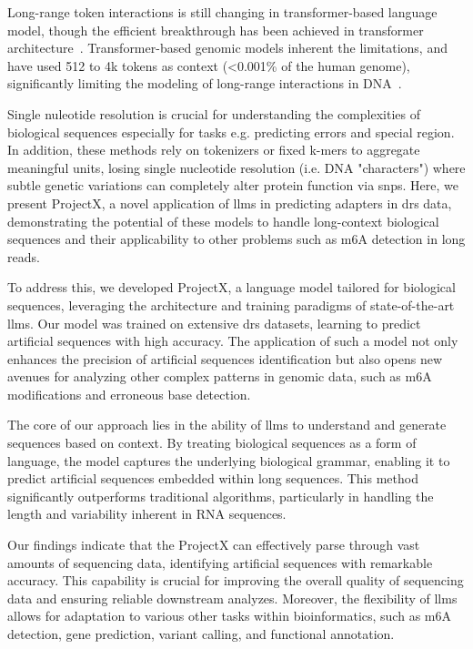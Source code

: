 \documentclass[pdflatex, sn-mathphys-num, lineno]{sn-jnl}%
\newcommand{\chopper}{ProjectX\xspace}
\theoremstyle{thmstyleone}%
\theoremstyle{thmstyletwo}%
\theoremstyle{thmstylethree}%
\begin{document}
Long-range token interactions is still changing in transformer-based language model,
though the efficient breakthrough has been achieved in transformer architecture~\cite{tay2022efficient}.
Transformer-based genomic models  inherent the limitations, and have used 512 to 4k tokens as context (<0.001\% of the human genome), significantly limiting the modeling of long-range interactions in DNA~\cite{dalla2023nucleotide, zhou2023dnabert2, ji2021dnabert}.

Single nuleotide resolution is crucial for understanding the complexities of biological sequences especially for tasks e.g. predicting errors and special region.
In addition, these methods rely on tokenizers or fixed k-mers to aggregate meaningful units, losing single nucleotide resolution (i.e. DNA "characters") where subtle genetic variations can completely alter protein function via \glspl{snp}.
Here, we present \chopper, a novel application of \glspl{llm} in predicting adapters in \gls{drs} data, demonstrating the potential of these models to handle long-context biological sequences and their applicability to other problems such as m6A detection in long reads.

To address this, we developed \chopper, a language model tailored for biological sequences, leveraging the architecture and training paradigms of state-of-the-art \glspl{llm}.
Our model was trained on extensive \gls{drs} datasets, learning to predict artificial sequences with high accuracy.
The application of such a model not only enhances the precision of artificial sequences identification but also opens new avenues for analyzing other complex patterns in genomic data, such as m6A modifications and erroneous base detection.

The core of our approach lies in the ability of \glspl{llm} to understand and generate sequences based on context.
By treating biological sequences as a form of language, the model captures the underlying biological grammar, enabling it to predict  artificial sequences embedded within long sequences.
This method significantly outperforms traditional algorithms, particularly in handling the length and variability inherent in RNA sequences.

Our findings indicate that the \chopper can effectively parse through vast amounts of sequencing data, identifying  artificial sequences with remarkable accuracy.
This capability is crucial for improving the overall quality of sequencing data and ensuring reliable downstream analyzes.
Moreover, the flexibility of \glspl{llm} allows for adaptation to various other tasks within bioinformatics, such as m6A detection, gene prediction, variant calling, and functional annotation.
\end{document}
